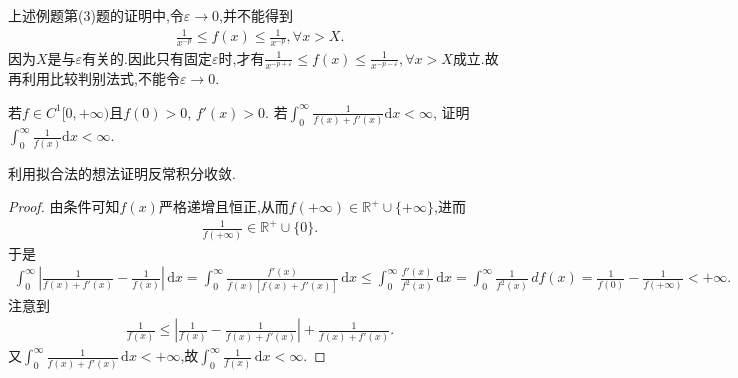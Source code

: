 \documentclass[../../main.tex]{subfiles}
\begin{document}
\begin{remark}
上述例题第(3)题的证明中,令$\varepsilon \to 0$,并不能得到
\begin{align*}
\frac{1}{x^{-p}}\leqslant f(x)\leqslant \frac{1}{x^{-p}},\forall x>X.
\end{align*}
因为$X$是与$\varepsilon$有关的.因此只有固定$\varepsilon$时,才有$\frac{1}{x^{-p+\varepsilon}}\leqslant f\left( x \right) \leqslant \frac{1}{x^{-p-\varepsilon}},\forall x>X$成立.故再利用比较判别法式,不能令$\varepsilon\to 0$.
\end{remark}

\begin{example}
若$f \in C^1[0, +\infty)$且$f(0) > 0$, $f'(x) > 0$. 若$\int_0^{\infty} \frac{1}{f(x) + f'(x)} \mathrm{d}x < \infty$, 证明$\int_0^{\infty} \frac{1}{f(x)} \mathrm{d}x < \infty$.
\end{example}
\begin{note}
利用拟合法的想法证明反常积分收敛.
\end{note}
\begin{proof}
由条件可知$f(x)$严格递增且恒正,从而$f(+\infty) \in \mathbb{R}^+ \cup \{+\infty\}$,进而
\begin{align*}
\frac{1}{f(+\infty)} \in \mathbb{R}^+ \cup \{0\}.
\end{align*}
于是
\begin{align*}
\int_0^{\infty} \left| \frac{1}{f(x) + f'(x)} - \frac{1}{f(x)} \right| \, \mathrm{d}x = \int_0^{\infty} \frac{f'(x)}{f(x) \left[ f(x) + f'(x) \right]} \, \mathrm{d}x \leqslant \int_0^{\infty} \frac{f'(x)}{f^2(x)} \, \mathrm{d}x = \int_0^{\infty} \frac{1}{f^2(x)} \, df(x) = \frac{1}{f(0)} - \frac{1}{f(+\infty)} < +\infty.
\end{align*}
注意到
\begin{align*}
\frac{1}{f(x)} \leqslant \left| \frac{1}{f(x)} - \frac{1}{f(x) + f'(x)} \right| + \frac{1}{f(x) + f'(x)}.
\end{align*}
又$\int_0^{\infty} \frac{1}{f(x) + f'(x)} \, \mathrm{d}x < +\infty$,故$\int_0^{\infty} \frac{1}{f(x)} \, \mathrm{d}x < \infty$.

\end{proof}
\end{document}
